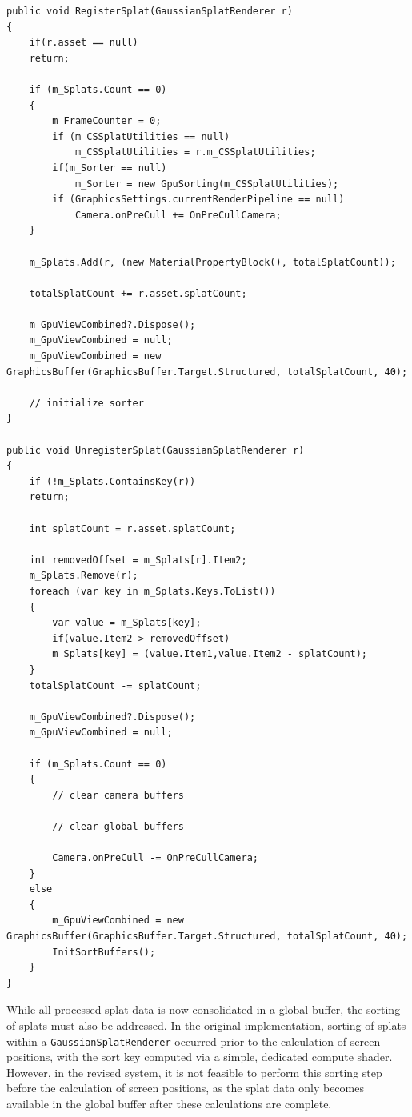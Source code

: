 \documentclass[12pt]{article}
\begin{document}
\begin{lstlisting}[tabsize=2,caption=New RegisterSplat and UnregisterSplat, label=code:register,breaklines=true,breakatwhitespace=true,basicstyle=\ttfamily\footnotesize]
public void RegisterSplat(GaussianSplatRenderer r)
{
	if(r.asset == null)
	return;
	
	if (m_Splats.Count == 0)
	{
		m_FrameCounter = 0;
		if (m_CSSplatUtilities == null)
			m_CSSplatUtilities = r.m_CSSplatUtilities;
		if(m_Sorter == null)
			m_Sorter = new GpuSorting(m_CSSplatUtilities);
		if (GraphicsSettings.currentRenderPipeline == null)
			Camera.onPreCull += OnPreCullCamera;
	}
	
	m_Splats.Add(r, (new MaterialPropertyBlock(), totalSplatCount));
	
	totalSplatCount += r.asset.splatCount;
	
	m_GpuViewCombined?.Dispose();
	m_GpuViewCombined = null;
	m_GpuViewCombined = new GraphicsBuffer(GraphicsBuffer.Target.Structured, totalSplatCount, 40);
	
	// initialize sorter
}

public void UnregisterSplat(GaussianSplatRenderer r)
{
	if (!m_Splats.ContainsKey(r))
	return;
	
	int splatCount = r.asset.splatCount;
	
	int removedOffset = m_Splats[r].Item2;
	m_Splats.Remove(r);
	foreach (var key in m_Splats.Keys.ToList())
	{
		var value = m_Splats[key];
		if(value.Item2 > removedOffset)
		m_Splats[key] = (value.Item1,value.Item2 - splatCount);
	}
	totalSplatCount -= splatCount;
	
	m_GpuViewCombined?.Dispose();
	m_GpuViewCombined = null;
	
	if (m_Splats.Count == 0)
	{
		// clear camera buffers
		
		// clear global buffers
		
		Camera.onPreCull -= OnPreCullCamera;
	}
	else
	{
		m_GpuViewCombined = new GraphicsBuffer(GraphicsBuffer.Target.Structured, totalSplatCount, 40);
		InitSortBuffers();
	}
}
\end{lstlisting}
While all processed splat data is now consolidated in a global buffer, the sorting of splats must also be addressed. In the original implementation, sorting of splats within a \texttt{GaussianSplatRenderer} occurred prior to the calculation of screen positions, with the sort key computed via a simple, dedicated compute shader. However, in the revised system, it is not feasible to perform this sorting step before the calculation of screen positions, as the splat data only becomes available in the global buffer after these calculations are complete.\\
\end{document}
